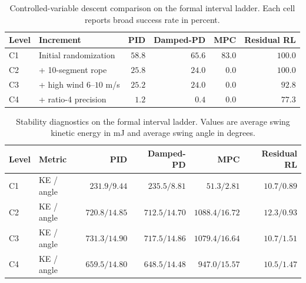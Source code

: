 
\begin{table}[t]
  \centering
  \caption{Controlled-variable descent comparison on the formal interval ladder. Each cell reports broad success rate in percent.}
  \label{tab:formal_interval_success}
  \setlength{\tabcolsep}{4.5pt}
  \begin{tabular}{llrrrr}
    \toprule
    Level & Increment & PID & Damped-PD & MPC & Residual RL \\
    \midrule
    C1 & Initial randomization
       & $58.8$ & $65.6$ & $83.0$ & $\mathbf{100.0}$ \\
    C2 & + 10-segment rope
       & $25.8$ & $24.0$ & $0.0$ & $\mathbf{100.0}$ \\
    C3 & + high wind $6$--$10$ m/s
       & $25.2$ & $24.0$ & $0.0$ & $\mathbf{92.8}$ \\
    C4 & + ratio-4 precision
       & $1.2$ & $0.4$ & $0.0$ & $\mathbf{77.3}$ \\
    \bottomrule
  \end{tabular}
\end{table}

\begin{table}[t]
  \centering
  \caption{Stability diagnostics on the formal interval ladder. Values are average swing kinetic energy in mJ and average swing angle in degrees.}
  \label{tab:formal_interval_stability}
  \setlength{\tabcolsep}{4.5pt}
  \begin{tabular}{llrrrr}
    \toprule
    Level & Metric & PID & Damped-PD & MPC & Residual RL \\
    \midrule
    C1 & KE / angle
       & $231.9 / 9.44$ & $235.5 / 8.81$ & $51.3 / 2.81$ & $\mathbf{10.7 / 0.89}$ \\
    C2 & KE / angle
       & $720.8 / 14.85$ & $712.5 / 14.70$ & $1088.4 / 16.72$ & $\mathbf{12.3 / 0.93}$ \\
    C3 & KE / angle
       & $731.3 / 14.90$ & $717.5 / 14.86$ & $1079.4 / 16.64$ & $\mathbf{10.7 / 1.51}$ \\
    C4 & KE / angle
       & $659.5 / 14.80$ & $648.5 / 14.48$ & $947.0 / 15.57$ & $\mathbf{10.5 / 1.47}$ \\
    \bottomrule
  \end{tabular}
\end{table}

